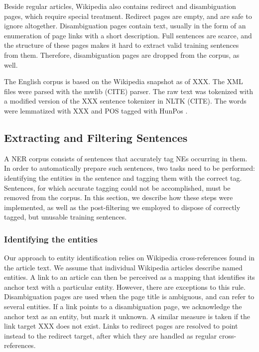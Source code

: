 \documentclass[11pt]{article}
\begin{document}
Beside regular articles, Wikipedia also contains redirect and disambiguation pages, which require special treatment. Redirect pages are empty, and are safe to ignore altogether. Disambiguation pages contain text, usually in the form of an enumeration of page links with a short description. Full sentences are scarce, and the structure of these pages makes it hard to extract valid training sentences from them. Therefore, disambiguation pages are dropped from the corpus, as well.

The English corpus is based on the Wikipedia snapshot as of XXX. The XML files were parsed with the mwlib (CITE) parser. The raw text was tokenized with a modified version of the XXX sentence tokenizer in NLTK (CITE). The words were lemmatized with XXX and POS tagged with HunPos \cite{Halacsy:07}. 


\subsection{Extracting and Filtering Sentences}

A NER corpus consists of sentences that accurately tag NEs occurring in them. In order to automatically prepare such sentences, two tasks need to be performed: identifying the entities in the sentence and tagging them with the correct tag. Sentences, for which accurate tagging could not be accomplished, must be removed from the corpus. In this section, we describe how these steps were implemented, as well as the post-filtering we employed to dispose of correctly tagged, but unusable training sentences.

\subsubsection{Identifying the entities}

Our approach to entity identification relies on Wikipedia cross-references found in the article text. We assume that individual Wikipedia articles describe named entities. A link to an article can then be perceived as a mapping that identifies its anchor text with a particular entity. However, there are exceptions to this rule. Disambiguation pages are used when the page title is ambiguous, and can refer to several entities. If a link points to a disambiguation page, we acknowledge the anchor text as an entity, but mark it unknown. A similar measure is taken if the link target XXX does not exist. Links to redirect pages are resolved to point instead to the redirect target, after which they are handled as regular cross-references.
\end{document}
